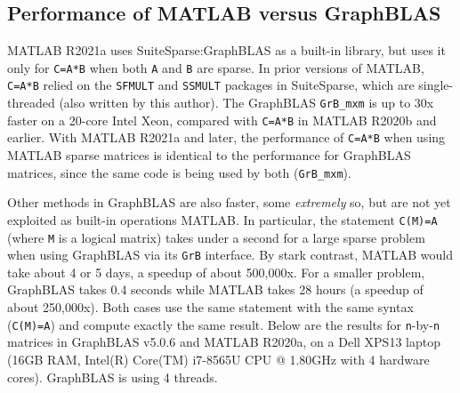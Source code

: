 
\subsection{Performance of MATLAB versus GraphBLAS}
\label{matlab_performance}

MATLAB R2021a uses SuiteSparse:GraphBLAS as a built-in library, but
uses it only for \verb'C=A*B' when both \verb'A' and \verb'B' are sparse.  In
prior versions of MATLAB, \verb'C=A*B' relied on the \verb'SFMULT' and
\verb'SSMULT' packages in SuiteSparse, which are single-threaded (also written
by this author).  The GraphBLAS \verb'GrB_mxm' is up to 30x faster on a 20-core
Intel Xeon, compared with \verb'C=A*B' in MATLAB R2020b and earlier.  With
MATLAB R2021a and later, the performance of \verb'C=A*B' when using MATLAB
sparse matrices is identical to the performance for GraphBLAS matrices, since
the same code is being used by both (\verb'GrB_mxm').

Other methods in GraphBLAS are also faster, some {\em extremely} so, but are
not yet exploited as built-in operations MATLAB.  In particular, the statement
\verb'C(M)=A' (where \verb'M' is a logical matrix) takes under a second for a
large sparse problem when using GraphBLAS via its \verb'GrB' interface.  By
stark contrast, MATLAB would take about 4 or 5 days, a speedup of about
500,000x.  For a smaller problem, GraphBLAS takes 0.4 seconds while MATLAB
takes 28 hours (a speedup of about 250,000x).  Both cases use the same
statement with the same syntax (\verb'C(M)=A') and compute exactly the same
result.  Below are the results for \verb'n'-by-\verb'n' matrices in GraphBLAS
v5.0.6 and MATLAB R2020a, on a Dell XPS13 laptop (16GB RAM, Intel(R) Core(TM)
i7-8565U CPU @ 1.80GHz with 4 hardware cores).  GraphBLAS is using 4 threads.

